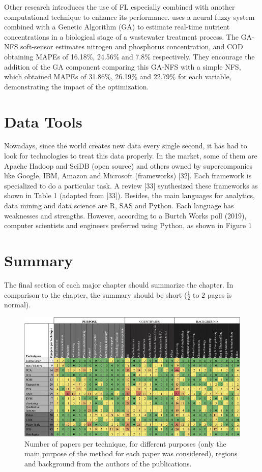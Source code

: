 Other research introduces the use of FL especially combined with another computational technique to enhance its performance. \cite{Huang2015} uses a neural fuzzy system combined with a Genetic Algorithm (GA) to estimate real-time nutrient concentrations in a biological stage of a wastewater treatment process. The GA-NFS soft-sensor estimates nitrogen and phosphorus concentration, and COD obtaining MAPEs of 16.18\%, 24.56\% and 7.8\% respectively. They encourage the addition of the GA component comparing this GA-NFS with a simple NFS, which obtained MAPEs of 31.86\%, 26.19\% and 22.79\% for each variable, demonstrating the impact of the optimization.

\section{Data Tools}
\label{s:Related-Works-Data-Tools}

Nowadays, since the world creates new data every single second, it has had to look for technologies to treat this data properly. In the market, some of them are Apache Hadoop and SciDB (open source) and others owned by supercompanies like Google, IBM, Amazon and Microsoft (frameworks) [32]. Each framework is specialized to do a particular task. A review [33] synthesized these frameworks as shown in Table 1 (adapted from [33]). Besides, the main languages for analytics, data mining and data science are R, SAS and Python. Each language has weaknesses and strengths. However, according to a Burtch Works poll (2019), computer scientists and engineers preferred using Python, as shown in Figure 1

\section{Summary}
\label{s:Related-Works-Summary}

The final section of each major chapter should summarize the chapter. In comparison to the chapter, the summary should be short ($\frac{1}{2}$ to $2$ pages is normal).

\begin{figure}[t]
\centering
\includegraphics[width=16cm]{tables/PaperTable.jpg}
\caption{Number of papers per technique, for different purposes (only the main purpose of the method for each paper was considered), regions and background from the authors of the publications.}
\label{f:Papers Table}
\end{figure}
